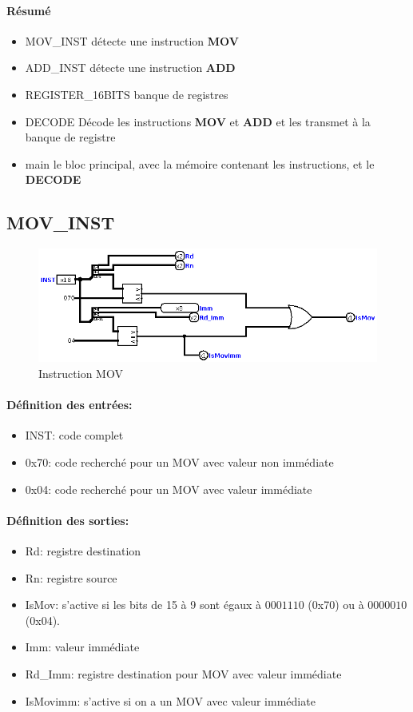 \documentclass[a4paper]{article} %
\begin{document}
\paragraph{Résumé}
\begin{itemize}
    \item     MOV\_INST détecte une instruction \textbf{MOV}
    \item     ADD\_INST détecte une instruction \textbf{ADD}
    \item     REGISTER\_16BITS banque de registres
    \item     DECODE Décode les instructions \textbf{MOV} et \textbf{ADD} et les transmet à la banque de registre
    \item     main le bloc principal, avec la mémoire contenant les instructions, et le \textbf{DECODE}
\end{itemize}

\subsection{MOV\_INST}

\begin{figure}[H]
    \centering
    \includegraphics[width=.8\textwidth]{src/MOV_INST.png}
    \caption{Instruction MOV}
    \label{mov_img}
\end{figure}
\paragraph{Définition des entrées:}
\begin{itemize}
    \item     INST: code complet
    \item     0x70: code recherché pour un MOV avec valeur non immédiate
    \item     0x04: code recherché pour un MOV avec valeur immédiate
\end{itemize}

\paragraph{Définition des sorties:}
\begin{itemize}
    \item     Rd: registre destination
    \item     Rn: registre source
    \item     IsMov: s'active si les bits de 15 à 9 sont égaux à $0001110$ (0x70) ou à $0000010$ (0x04).
    \item     Imm: valeur immédiate
    \item     Rd\_Imm: registre destination pour MOV avec valeur immédiate
    \item     IsMovimm: s'active si on a un MOV avec valeur immédiate

\end{itemize}
\end{document}
